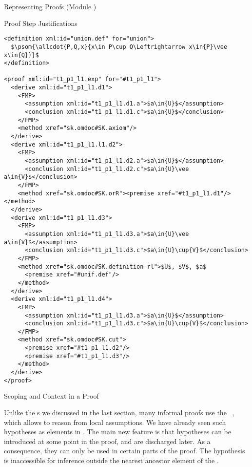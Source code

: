 \begin{omgroup}[id=proofs,short=Representing Proofs]{Representing Proofs (Module {})}
\begin{module}[id=justifications]
\begin{omgroup}[id=proofs.justifications]{Proof Step Justifications}
\begin{lstlisting}[label=lst:expansion2,mathescape,
  caption={An External Expansion of Step {\snippet{t\_1\_p1\_l1}} in {\mylstref{expansion}}},
  index={proof,derive,method,assumption,conclusion}]
<definition xml:id="union.def" for="union">
  $\psom{\allcdot{P,Q,x}{x\in P\cup Q\Leftrightarrow x\in{P}\vee x\in{Q}}}$
</definition>

<proof xml:id="t1_p1_l1.exp" for="#t1_p1_l1">
  <derive xml:id="t1_p1_l1.d1">
    <FMP>
      <assumption xml:id="t1_p1_l1.d1.a">$a\in{U}$</assumption>
      <conclusion xml:id="t1_p1_l1.d1.c">$a\in{U}$</conclusion>
    </FMP>
    <method xref="sk.omdoc#SK.axiom"/>
  </derive>
  <derive xml:id="t1_p1_l1.l1.d2">
    <FMP>
      <assumption xml:id="t1_p1_l1.d2.a">$a\in{U}$</assumption>
      <conclusion xml:id="t1_p1_l1.d2.c">$a\in{U}\vee a\in{V}$</conclusion>
    </FMP>
    <method xref="sk.omdoc#SK.orR"><premise xref="#t1_p1_l1.d1"/></method>
  </derive>
  <derive xml:id="t1_p1_l1.d3">
    <FMP>
      <assumption xml:id="t1_p1_l1.d3.a">$a\in{U}\vee a\in{V}$</assumption>
      <conclusion xml:id="t1_p1_l1.d3.c">$a\in{U}\cup{V}$</conclusion>
    </FMP>
    <method xref="sk.omdoc#SK.definition-rl">$U$, $V$, $a$
      <premise xref="#unif.def"/>
    </method>
  </derive>
  <derive xml:id="t1_p1_l1.d4">
    <FMP>
      <assumption xml:id="t1_p1_l1.d3.a">$a\in{U}$</assumption>
      <conclusion xml:id="t1_p1_l1.d3.c">$a\in{U}\cup{V}$</conclusion>
    </FMP>
    <method xref="sk.omdoc#SK.cut">
      <premise xref="#t1_p1_l1.d2"/>
      <premise xref="#t1_p1_l1.d3"/>
    </method>
  </derive>
</proof>          
\end{lstlisting}
\end{omgroup}
\end{module}

\begin{module}[id=scoping-proofs]
\begin{omgroup}[id=proofs.scoping]{Scoping and Context in a Proof}

Unlike the {s} we discussed in the last section, many
informal proofs use the ~\cite{Gentzen:uudlsiii35},
which allows to reason from local assumptions. We have already seen such hypotheses as
 elements in {}. The main new feature is
that hypotheses can be introduced at some point in the proof, and are discharged later.
As a consequence, they can only be used in certain parts of the proof.  The hypothesis is
inaccessible for inference outside the nearest ancestor  element of the
.
  

\end{omgroup}
\end{module}
\end{omgroup}
